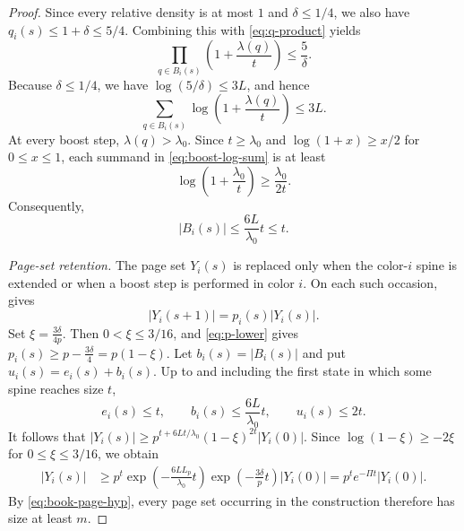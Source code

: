 \documentclass[twoside,12pt]{article}
\theoremstyle{definition}
\theoremstyle{remark}
\newcommand{\1}{\mathbf 1}
\begin{document}
\begin{proof}
Since every relative density is at most $1$ and $\delta\le1/4$, we also have
$q_i(s)\le1+\delta\le5/4$. Combining this with \eqref{eq:q-product} yields
\[
 \prod_{q\in B_i(s)}\left(1+\frac{\lambda(q)}t\right)
 \le\frac5\delta.
\]
Because $\delta\le1/4$, we have $\log(5/\delta)\le3L$, and hence
\begin{equation}\label{eq:boost-log-sum}
 \sum_{q\in B_i(s)}
 \log\left(1+\frac{\lambda(q)}t\right)
 \le3L.
\end{equation}
At every boost step, $\lambda(q)>\lambda_0$. Since $t\ge\lambda_0$ and
$\log(1+x)\ge x/2$ for $0\le x\le1$, each summand in
\eqref{eq:boost-log-sum} is at least
\[
 \log\left(1+\frac{\lambda_0}{t}\right)
 \ge\frac{\lambda_0}{2t}.
\]
Consequently,
\begin{equation}\label{eq:boost-count}
 |B_i(s)|\le\frac{6L}{\lambda_0}t\le t.
\end{equation}

\medskip
\noindent\emph{Page-set retention.}
The page set $Y_i(s)$ is replaced only when the color-$i$ spine is extended
or when a boost step is performed in color $i$. On each such occasion,
 gives
\[
 |Y_i(s+1)|=p_i(s)|Y_i(s)|.
\]
Set
$\xi=\frac{3\delta}{4p}.$
Then $0<\xi\le3/16$, and \eqref{eq:p-lower} gives
$
 p_i(s)\ge p-\frac{3\delta}{4}=p(1-\xi).
$
Let $b_i(s)=|B_i(s)|$ and put $u_i(s)=e_i(s)+b_i(s)$. Up to and including
the first state in which some spine reaches size $t$,
\[
 e_i(s)\le t,
 \qquad
 b_i(s)\le\frac{6L}{\lambda_0}t,
 \qquad
 u_i(s)\le2t.
\]
It follows that
$
 |Y_i(s)|
 \ge p^{t+6Lt/\lambda_0}(1-\xi)^{2t}|Y_i(0)|.
$
Since $\log(1-\xi)\ge-2\xi$ for $0\le\xi\le3/16$, we obtain
\begin{align}
 |Y_i(s)|
 &\ge p^t
 \exp\!\left(-\frac{6LL_p}{\lambda_0}t\right)
 \exp\!\left(-\frac{3\delta}{p}t\right)|Y_i(0)|=p^te^{-\Pi t}|Y_i(0)|.
 \label{eq:page-retention}
\end{align}
By \eqref{eq:book-page-hyp}, every page set occurring in the construction
therefore has size at least $m$.


\end{proof}
\end{document}

